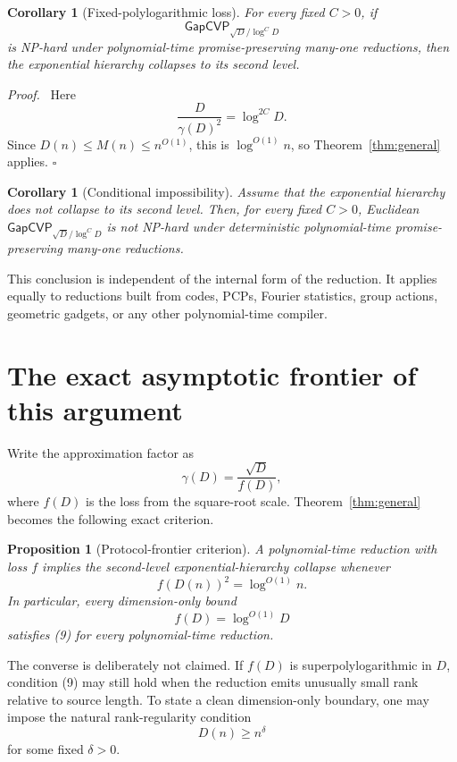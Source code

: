 \documentclass[11pt]{article}
\newtheorem{corollary}[theorem]{Corollary}
\newtheorem{proposition}[theorem]{Proposition}
\newenvironment{proof}{\par\noindent\textit{Proof.}\ }{\hfill$\square$\par}
\newcommand{\GapCVP}{\mathsf{GapCVP}}
\begin{document}
\begin{corollary}[Fixed-polylogarithmic loss]                       \label{cor:polylog}
For every fixed $C>0$, if
\[
  \GapCVP_{\sqrt D/\log^C D}
\]
is NP-hard under polynomial-time promise-preserving many-one reductions, then
the exponential hierarchy collapses to its second level.
\end{corollary}

\begin{proof}
Here
\[
  \frac{D}{\gamma(D)^2}=\log^{2C}D.
\]
Since $D(n)\le M(n)\le n^{O(1)}$, this is $\log^{O(1)}n$, so
Theorem~\ref{thm:general} applies.
\end{proof}

\begin{corollary}[Conditional impossibility]
Assume that the exponential hierarchy does not collapse to its second level.
Then, for every fixed $C>0$, Euclidean
$\GapCVP_{\sqrt D/\log^C D}$ is not NP-hard under deterministic
polynomial-time promise-preserving many-one reductions.
\end{corollary}

This conclusion is independent of the internal form of the reduction.  It
applies equally to reductions built from codes, PCPs, Fourier statistics,
group actions, geometric gadgets, or any other polynomial-time compiler.

\section{The exact asymptotic frontier of this argument}

Write the approximation factor as
\[
  \gamma(D)=\frac{\sqrt D}{f(D)},                         \tag{8}
\]
where $f(D)$ is the loss from the square-root scale.  Theorem~\ref{thm:general}
becomes the following exact criterion.

\begin{proposition}[Protocol-frontier criterion]                   \label{prop:frontier}
A polynomial-time reduction with loss $f$ implies the second-level
exponential-hierarchy collapse whenever
\[
  f(D(n))^2=\log^{O(1)}n.                                 \tag{9}
\]
In particular, every dimension-only bound
\[
  f(D)=\log^{O(1)}D                                      \tag{10}
\]
satisfies (9) for every polynomial-time reduction.
\end{proposition}

The converse is deliberately not claimed.  If $f(D)$ is superpolylogarithmic
in $D$, condition (9) may still hold when the reduction emits unusually small
rank relative to source length.  To state a clean dimension-only boundary,
one may impose the natural rank-regularity condition
\[
  D(n)\ge n^{\delta}                                     \tag{11}
\]
for some fixed $\delta>0$.
\end{document}
